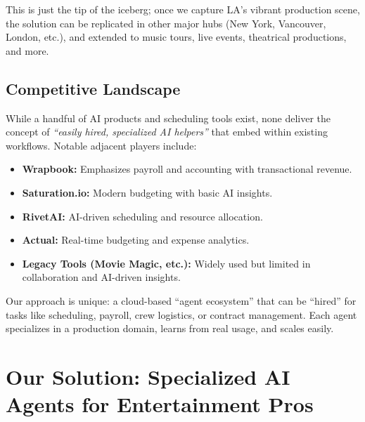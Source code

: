 \documentclass[11pt]{article}
\begin{document}
This is just the tip of the iceberg; once we capture LA’s vibrant production scene, the solution can be replicated in other major hubs (New York, Vancouver, London, etc.), and extended to music tours, live events, theatrical productions, and more.

\subsection{Competitive Landscape}
While a handful of AI products and scheduling tools exist, none deliver the concept of \textit{“easily hired, specialized AI helpers”} that embed within existing workflows. Notable adjacent players include:
\begin{itemize}
    \item \textbf{Wrapbook:} Emphasizes payroll and accounting with transactional revenue.
    \item \textbf{Saturation.io:} Modern budgeting with basic AI insights.
    \item \textbf{RivetAI:} AI-driven scheduling and resource allocation.
    \item \textbf{Actual:} Real-time budgeting and expense analytics.
    \item \textbf{Legacy Tools (Movie Magic, etc.):} Widely used but limited in collaboration and AI-driven insights.
\end{itemize}

Our approach is unique: a cloud-based “agent ecosystem” that can be “hired” for tasks like scheduling, payroll, crew logistics, or contract management. Each agent specializes in a production domain, learns from real usage, and scales easily.

\section{Our Solution: Specialized AI Agents for Entertainment Pros}
\end{document}
